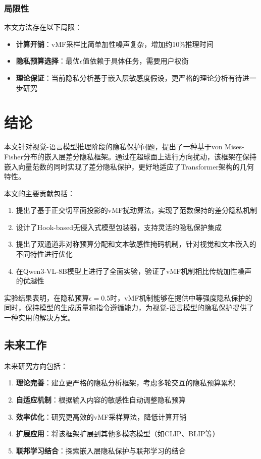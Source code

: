 \documentclass[a4paper,12pt]{article}
\begin{document}
\subsubsection{局限性}

本文方法存在以下局限：
\begin{itemize}
  \item \textbf{计算开销}：vMF采样比简单加性噪声复杂，增加约10\%推理时间
  \item \textbf{隐私预算选择}：最优$\epsilon$值依赖于具体任务，需要用户权衡
  \item \textbf{理论保证}：当前隐私分析基于嵌入层敏感度假设，更严格的理论分析有待进一步研究
\end{itemize}

\section{结论}

本文针对视觉-语言模型推理阶段的隐私保护问题，提出了一种基于von Mises-Fisher分布的嵌入层差分隐私框架。通过在超球面上进行方向扰动，该框架在保持嵌入向量范数的同时实现了差分隐私保护，更好地适应了Transformer架构的几何特性。

本文的主要贡献包括：
\begin{enumerate}
  \item 提出了基于正交切平面投影的vMF扰动算法，实现了范数保持的差分隐私机制
  \item 设计了Hook-based无侵入式模型包装器，支持灵活的隐私保护集成
  \item 提出了双通道非对称预算分配和文本敏感性掩码机制，针对视觉和文本嵌入的不同特性进行优化
  \item 在Qwen3-VL-8B模型上进行了全面实验，验证了vMF机制相比传统加性噪声的优越性
\end{enumerate}

实验结果表明，在隐私预算$\epsilon=0.5$时，vMF机制能够在提供中等强度隐私保护的同时，保持模型的生成质量和指令遵循能力，为视觉-语言模型的隐私保护提供了一种实用的解决方案。

\subsection{未来工作}

未来研究方向包括：
\begin{enumerate}
  \item \textbf{理论完善}：建立更严格的隐私分析框架，考虑多轮交互的隐私预算累积
  \item \textbf{自适应机制}：根据输入内容的敏感性自动调整隐私预算
  \item \textbf{效率优化}：研究更高效的vMF采样算法，降低计算开销
  \item \textbf{扩展应用}：将该框架扩展到其他多模态模型（如CLIP、BLIP等）
  \item \textbf{联邦学习结合}：探索嵌入层隐私保护与联邦学习的结合
\end{enumerate}
\end{document}
